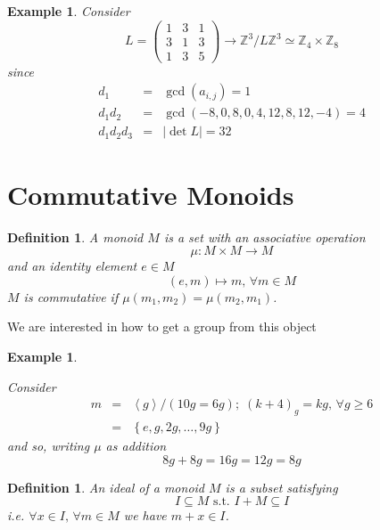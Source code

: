 \documentclass[11pt,english]{article}
\newtheorem{definition}[theorem]{Definition}
\newtheorem{example}[theorem]{Example}
\begin{document}
\begin{example}

Consider\[
L=\left(\begin{array}{ccc}
1 & 3 & 1\\
3 & 1 & 3\\
1 & 3 & 5\end{array}\right)\rightarrow\mathbb{Z}^{3}/L\mathbb{Z}^{3}\simeq\mathbb{Z}_{4}\times\mathbb{Z}_{8}\]
since\begin{eqnarray*}
d_{1} & = & \gcd\left(a_{i,j}\right)=1\\
d_{1}d_{2} & = & \gcd\left(-8,0,8,0,4,12,8,12,-4\right)=4\\
d_{1}d_{2}d_{3} & = & \left|\det L\right|=32\end{eqnarray*}


\end{example}


\section{Commutative Monoids}

\begin{definition}

A monoid $M$ is a set with an associative operation\[
\mu:M\times M\rightarrow M\]
and an identity element $e\in M$\[
\left(e,m\right)\mapsto m,\,\forall m\in M\]
$M$ is commutative if $\mu\left(m_{1},m_{2}\right)=\mu\left(m_{2},m_{1}\right)$.

\end{definition}

We are interested in how to get a group from this object

\begin{example}\label{monoid_example}

Consider\begin{eqnarray*}
m & = & \left\langle g\right\rangle /\left(10g=6g\right);\;\left(k+4\right)_{g}=kg,\,\forall g\ge6\\
 & = & \left\{ e,g,2g,\ldots,9g\right\} \end{eqnarray*}
and so, writing $\mu$ as addition \[
8g+8g=16g=12g=8g\]


\end{example}

\begin{definition}

An ideal of a monoid $M$ is a subset satisfying\[
I\subseteq M\text{ s.t. }I+M\subseteq I\]
i.e. $\forall x\in I,\,\forall m\in M$ we have $m+x\in I$.

\end{definition}
\end{document}
